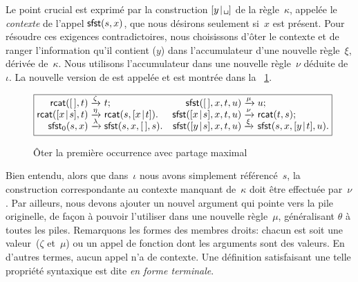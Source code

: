 Le point crucial est exprimé par la construction
\(\cons{y}{\texttt{\textvisiblespace}}\) de la règle~\(\kappa\),
appelée le \emph{contexte}
de l'appel \(\textsf{sfst}(s,x)\), que nous
désirons seulement si~\(x\) est présent. Pour résoudre ces exigences
contradictoires, nous choisissons d'ôter le contexte et de ranger
l'information qu'il contient (\(y\)) dans l'accumulateur d'une nouvelle règle~\(\xi\), dérivée
de~\(\kappa\). Nous utilisons l'accumulateur dans une nouvelle
règle~\(\nu\) déduite de~\(\iota\). La nouvelle version de
 est appelée
 et est montrée dans
la \fig~\ref{fig:sfst0}.
\begin{figure}
\begin{equation*}
\boxed{%
\begin{array}{@{}r@{\;}l@{\;}lr@{\;}l@{\;}l@{}}
  \fun{rcat}(\el,t)              & \xrightarrow{\smash{\zeta}} & t; &
  \fun{sfst}(\el,x,t,u)          & \xrightarrow{\smash{\mu}} & u;\\
  \fun{rcat}(\cons{x}{s},t)      & \xrightarrow{\smash{\eta}}
                               & \fun{rcat}(s,\cons{x}{t}). &
\fun{sfst}(\cons{x}{s},x,t,u)  & \xrightarrow{\smash{\nu}}
                               & \fun{rcat}(t,s);\\
\fun{sfst}_0(s,x)              & \xrightarrow{\smash{\lambda}}
                               & \fun{sfst}(s,x,\el,s). &
\fun{sfst}(\cons{y}{s},x,t,u)  & \xrightarrow{\smash{\xi}}
                               & \fun{sfst}(s,x,\cons{y}{t},u).
\end{array}}
\end{equation*}
\caption{Ôter la première occurrence avec partage maximal}
\label{fig:sfst0}
\end{figure}

Bien entendu, alors que dans~\(\iota\) nous avons simplement
référencé~\(s\), la construction correspondante au contexte manquant
de~\(\kappa\) doit être effectuée par~\(\nu\). Par ailleurs, nous
devons ajouter un nouvel argument qui pointe vers la pile originelle,
de façon à pouvoir l'utiliser dans une nouvelle règle~\(\mu\),
généralisant \(\theta\) à toutes les piles. Remarquons les formes des
membres droits: chacun est soit une valeur~(\(\zeta\) et~\(\mu\)) ou
un appel de fonction dont les arguments sont des valeurs. En d'autres
termes, aucun appel n'a de contexte. Une définition satisfaisant une
telle propriété syntaxique est dite \emph{en forme
  terminale}.

